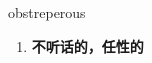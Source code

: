 
\begin{frame}
{\huge obstreperous}
\begin{center}
\begin{enumerate}\Large
  \item \textbf{不听话的，任性的}
\end{enumerate}
\end{center}
\end{frame}
